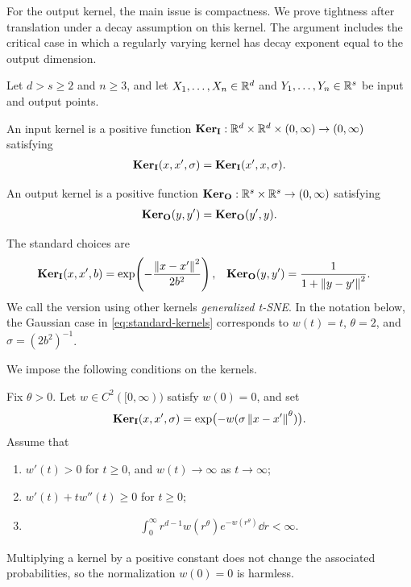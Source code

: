 For the output kernel, the main issue is compactness. We prove tightness
after translation under a decay assumption on this kernel. The argument
includes the critical case in which a regularly varying kernel has decay
exponent equal to the output dimension.

Let $d>s\geq2$ and $n\geq3$, and let $X_1,\dots,X_n\in\mathbb{R}^d$ and $Y_1,\dots,Y_n\in\mathbb{R}^s$ be input and output points.
\begin{definition}\label{def:input_kernel}
An input kernel is a positive function
$\mathbf{Ker}_{\mathbf{I}}:\mathbb{R}^d\times\mathbb{R}^d\times(0,\infty)\to(0,\infty)$ satisfying
\begin{align}
\mathbf{Ker}_{\mathbf{I}}(x,x',\sigma)=\mathbf{Ker}_{\mathbf{I}}(x',x,\sigma).
\end{align}
\end{definition}
\begin{definition}\label{def:output_kernel}
An output kernel is a positive function
$\mathbf{Ker}_{\mathbf{O}}:\mathbb{R}^s\times\mathbb{R}^s\to(0,\infty)$ satisfying
\begin{align}
\mathbf{Ker}_{\mathbf{O}}(y,y')=\mathbf{Ker}_{\mathbf{O}}(y',y).
\end{align}
\end{definition}
The standard choices are
\begin{align}\label{eq:standard-kernels}
\mathbf{Ker}_{\mathbf{I}}(x,x',b)&=\exp\!\left(-\frac{\left\lVert x-x'\right\rVert^2}{2b^2}\right),
&\mathbf{Ker}_{\mathbf{O}}(y,y')&=\frac{1}{1+\left\lVert y-y'\right\rVert^2}.
\end{align}
We call the version using other kernels \emph{generalized t-SNE}. In the notation below, the Gaussian case in \eqref{eq:standard-kernels} corresponds to $w(t)=t$, $\theta=2$, and $\sigma=(2b^2)^{-1}$.

We impose the following conditions on the kernels.
\begin{condition}\label{input_kernel_conditions}
Fix $\theta>0$. Let $w\in C^2([0,\infty))$ satisfy $w(0)=0$, and set
\begin{align}\label{tsne:input_kernel}
\mathbf{Ker}_{\mathbf{I}}(x,x',\sigma)=\exp\bigl(-w(\sigma\left\lVert x-x'\right\rVert^\theta)\bigr).
\end{align}
Assume that
\begin{enumerate}[label=(\arabic*),nosep]
\item $w'(t)>0$ for $t\geq0$, and $w(t)\to\infty$ as $t\to\infty$;
\item $w'(t)+tw''(t)\geq0$ for $t\geq0$;
\item
\begin{align}\label{eq:weighted-input-integrability}
\int_0^\infty r^{d-1}w(r^\theta)e^{-w(r^\theta)}\dd r<\infty.
\end{align}
\end{enumerate}
\end{condition}
Multiplying a kernel by a positive constant does not change the associated probabilities, so the normalization $w(0)=0$ is harmless.

